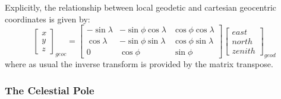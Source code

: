 \documentclass[11pt,twoside]{article}   %
\begin{document}
Explicitly, the relationship between local geodetic and cartesian
geocentric coordinates is given by:
%
 \begin{equation}
 \left [ \begin{array}{c}
  x \\ y \\ z
 \end{array} \right ]_{geoc}
 =
 \left [ \begin{array}{ccc}
  -\sin\lambda & -\sin\phi\cos\lambda & \cos\phi\cos\lambda \\
  \cos\lambda  & -\sin\phi\sin\lambda & \cos\phi\sin\lambda \\
  0            &  \cos\phi            & \sin\phi
 \end{array} \right ]
  \left [ \begin{array}{c}
  east \\ north \\ zenith
 \end{array} \right ]_{geod}
 \end{equation}
%
where as usual the inverse transform is provided by the matrix
transpose.

 \subsubsection{The Celestial Pole}
\end{document}
